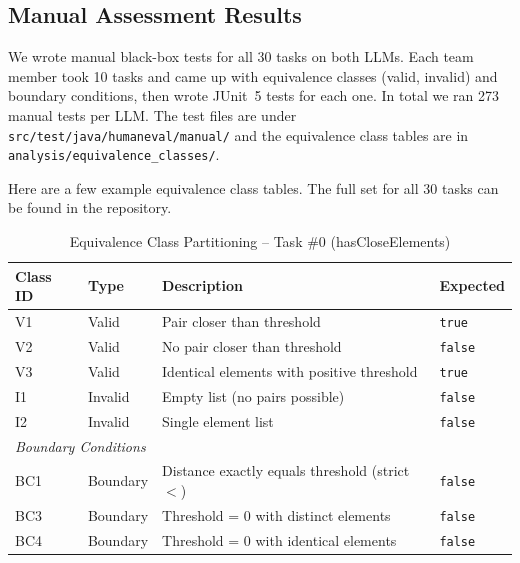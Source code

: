 \documentclass[12pt, a4paper]{article}
\begin{document}
\subsection{Manual Assessment Results}

We wrote manual black-box tests for all 30 tasks on both LLMs. Each team member took 10 tasks and came up with equivalence classes (valid, invalid) and boundary conditions, then wrote JUnit~5 tests for each one. In total we ran 273 manual tests per LLM. The test files are under \texttt{src/test/java/humaneval/manual/} and the equivalence class tables are in \texttt{analysis/equivalence\_classes/}.

Here are a few example equivalence class tables. The full set for all 30 tasks can be found in the repository.

\begin{table}[H]
\centering
\caption{Equivalence Class Partitioning -- Task \#0 (hasCloseElements)}
\label{tab:ecp-task0}
\begin{tabularx}{\textwidth}{l l X l}
\toprule
\textbf{Class ID} & \textbf{Type} & \textbf{Description} & \textbf{Expected} \\
\midrule
V1 & Valid   & Pair closer than threshold & \texttt{true} \\
V2 & Valid   & No pair closer than threshold & \texttt{false} \\
V3 & Valid   & Identical elements with positive threshold & \texttt{true} \\
I1 & Invalid & Empty list (no pairs possible) & \texttt{false} \\
I2 & Invalid & Single element list & \texttt{false} \\
\midrule
\multicolumn{4}{l}{\textit{Boundary Conditions}} \\
\midrule
BC1 & Boundary & Distance exactly equals threshold (strict $<$) & \texttt{false} \\
BC3 & Boundary & Threshold = 0 with distinct elements & \texttt{false} \\
BC4 & Boundary & Threshold = 0 with identical elements & \texttt{false} \\
\bottomrule
\end{tabularx}
\end{table}
\end{document}
